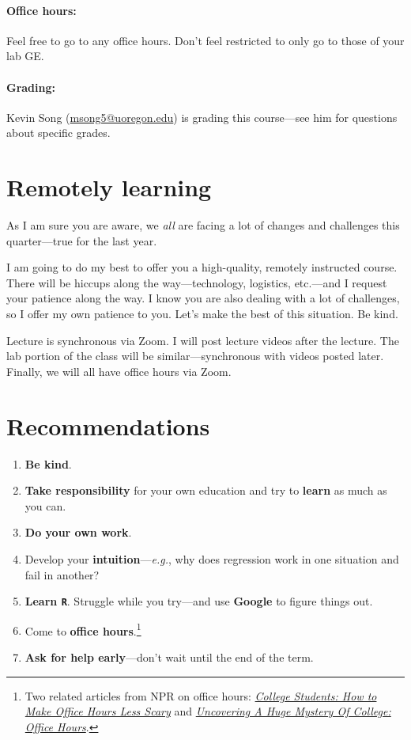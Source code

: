 \documentclass[10pt]{article}
\begin{document}
\paragraph{Office hours:} Feel free to go to any office hours. Don't feel restricted to only go to those of your lab GE.

\paragraph{Grading:} Kevin Song (\href{mailto:msong5@uoregon.edu}{msong5@uoregon.edu}) is grading this course---see him for questions about specific grades.

\section*{Remotely learning}

As I am sure you are aware, we \textit{all} are facing a lot of changes and challenges this quarter---true for the last year.

I am going to do my best to offer you a high-quality, remotely instructed course. There will be hiccups along the way---technology, logistics, etc.---and I request your patience along the way. I know you are also dealing with a lot of challenges, so I offer my own patience to you. Let's make the best of this situation. Be kind.

Lecture is synchronous via Zoom. I will post lecture videos after the lecture. The lab portion of the class will be similar---synchronous with videos posted later. Finally, we will all have office hours via Zoom.

\section*{Recommendations}

\begin{enumerate}
  \item \textbf{Be kind}.
  \item \textbf{Take responsibility} for your own education and try to \textbf{learn} as much as you can.
  \item \textbf{Do your own work}.
  \item Develop your \textbf{intuition}---\textit{e.g.}, why does regression work in one situation and fail in another?
  \item \textbf{Learn \texttt{R}}. Struggle while you try---and use \textbf{Google} to figure things out.
  \item Come to \textbf{office hours}.\footnote{Two related articles from NPR on office hours: \href{https://www.npr.org/2019/10/05/678815966/college-students-how-to-make-office-hours-less-scary}{\textit{College Students: How to Make Office Hours Less Scary}} and \href{https://www.npr.org/2019/10/02/766568824/uncovering-a-huge-mystery-of-college-office-hours}{\textit{Uncovering A Huge Mystery Of College: Office Hours}}.}
  \item \textbf{Ask for help early}---don't wait until the end of the term.
\end{enumerate}
\end{document}
